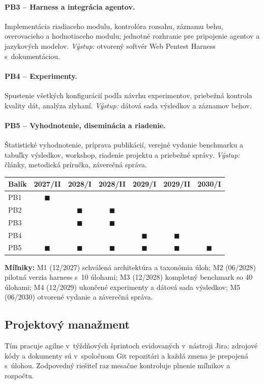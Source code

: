 \documentclass[11pt,a4paper]{article}
\newcommand{\bod}[1]{\subsection*{#1}}
\begin{document}
\paragraph{PB3 -- Harness a integrácia agentov.} Implementácia riadiaceho modulu, kontrolóra rozsahu, záznamu behu, overovacieho a hodnotiaceho modulu; jednotné rozhranie pre pripojenie agentov a jazykových modelov. \emph{Výstup:} otvorený softvér Web Pentest Harness s~dokumentáciou.

\paragraph{PB4 -- Experimenty.} Spustenie všetkých konfigurácií podľa návrhu experimentov, priebežná kontrola kvality dát, analýza zlyhaní. \emph{Výstup:} dátová sada výsledkov a záznamov behov.

\paragraph{PB5 -- Vyhodnotenie, diseminácia a riadenie.} Štatistické vyhodnotenie, príprava publikácií, verejné vydanie benchmarku a tabuľky výsledkov, workshop, riadenie projektu a priebežné správy. \emph{Výstup:} články, metodická príručka, záverečná správa.

\medskip\noindent
\begin{tabular}{@{}l*{6}{c}@{}}
\toprule
\textbf{Balík} & \textbf{2027/II} & \textbf{2028/I} & \textbf{2028/II} & \textbf{2029/I} & \textbf{2029/II} & \textbf{2030/I} \\ \midrule
PB1 & $\blacksquare$ & & & & & \\
PB2 & & $\blacksquare$ & $\blacksquare$ & & & \\
PB3 & & $\blacksquare$ & $\blacksquare$ & & & \\
PB4 & & & & $\blacksquare$ & $\blacksquare$ & \\
PB5 & $\blacksquare$ & $\blacksquare$ & $\blacksquare$ & $\blacksquare$ & $\blacksquare$ & $\blacksquare$ \\ \bottomrule
\end{tabular}

\medskip\noindent\textbf{Míľniky:}
M1 (12/2027) schválená architektúra a taxonómia úloh;
M2 (06/2028) pilotná verzia harness s~10 úlohami;
M3 (12/2028) kompletný benchmark so 40 úlohami;
M4 (12/2029) ukončené experimenty a dátová sada výsledkov;
M5 (06/2030) otvorené vydanie a záverečná správa.

\bod{Projektový manažment}
Tím pracuje agilne v~týždňových šprintoch evidovaných v~nástroji Jira; zdrojové kódy a dokumenty sú v~spoločnom Git repozitári a každá zmena je prepojená s~úlohou. Zodpovedný riešiteľ raz mesačne kontroluje plnenie míľnikov a rozpočtu.
\end{document}
